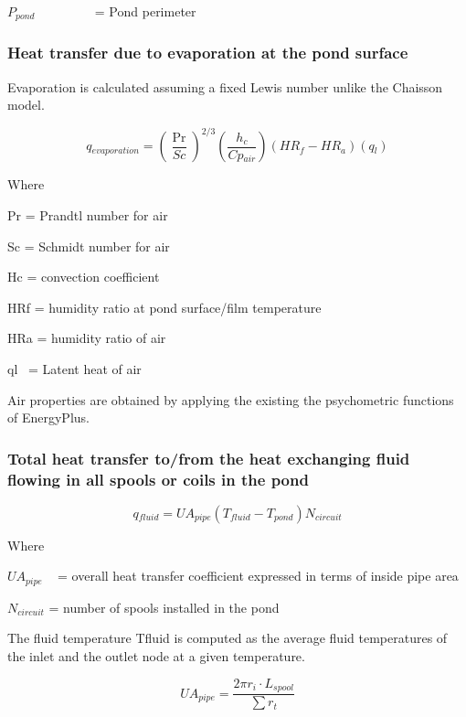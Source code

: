 \(P{}_{pond}\) ~~~~~~~~ = Pond perimeter

\subsubsection{Heat transfer due to evaporation at the pond surface}\label{heat-transfer-due-to-evaporation-at-the-pond-surface}

Evaporation is calculated assuming a fixed Lewis number unlike the Chaisson model.

\begin{equation}
q{}_{evaporation} = {\left( {\frac{{\Pr }}{{Sc}}} \right)^{2/3}}\left( {\frac{{h{}_c}}{{Cp{}_{air}}}} \right)\left( {HR{}_f - HR{}_a} \right)\left( {q{}_l} \right)
\end{equation}

Where

Pr = Prandtl number for air

Sc = Schmidt number for air

Hc = convection coefficient

HRf = humidity ratio at pond surface/film temperature

HRa = humidity ratio of air

ql~ = Latent heat of air

Air properties are obtained by applying the existing the psychometric functions of EnergyPlus.

\subsubsection{Total heat transfer to/from the heat exchanging fluid flowing in all spools or coils in the pond}\label{total-heat-transfer-tofrom-the-heat-exchanging-fluid-flowing-in-all-spools-or-coils-in-the-pond}

\begin{equation}
q{}_{fluid} = UA{}_{pipe}(T{}_{fluid} - T{}_{pond})N{}_{circuit}
\end{equation}

Where

\(UA{}_{pipe}\) ~ = overall heat transfer coefficient expressed in terms of inside pipe area

\(N{}_{circuit}\) = number of spools installed in the pond

The fluid temperature Tfluid is computed as the average fluid temperatures of the inlet and the outlet node at a given temperature.

\begin{equation}
U{A_{pipe}} = \frac{{2\pi {r_i}\cdot {L_{spool}}}}{{\sum {{r_t}} }}
\end{equation}

